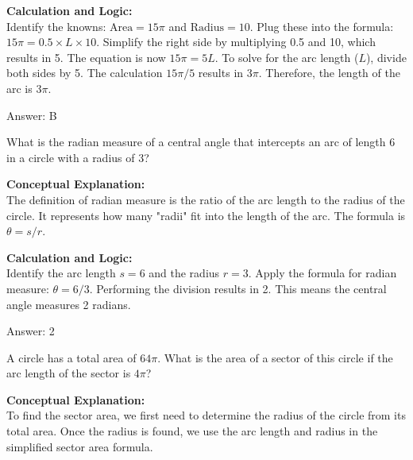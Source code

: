 \documentclass[11pt,paper=a4,answers]{exam}
\begin{document}
\begin{questions}
\begin{solution}
\vspace{30pt}

\textbf{Calculation and Logic:} \\
Identify the knowns: $\text{Area} = 15\pi$ and $\text{Radius} = 10$. Plug these into the formula: $15\pi = 0.5 \times L \times 10$. Simplify the right side by multiplying 0.5 and 10, which results in 5. The equation is now $15\pi = 5L$. To solve for the arc length ($L$), divide both sides by 5. The calculation $15\pi / 5$ results in $3\pi$. Therefore, the length of the arc is $3\pi$.

\vspace{30pt}

Answer: \colorbox{yellow!100}{B}
\end{solution}

\vspace{60pt}

\question
What is the radian measure of a central angle that intercepts an arc of length 6 in a circle with a radius of 3?

\begin{solution}
\textbf{Conceptual Explanation:} \\
The definition of radian measure is the ratio of the arc length to the radius of the circle. It represents how many "radii" fit into the length of the arc. The formula is $\theta = s / r$.

\vspace{30pt}

\textbf{Calculation and Logic:} \\
Identify the arc length $s = 6$ and the radius $r = 3$. Apply the formula for radian measure: $\theta = 6 / 3$. Performing the division results in 2. This means the central angle measures 2 radians.

\vspace{30pt}

Answer: \colorbox{yellow!100}{2}
\end{solution}

\vspace{60pt}

\question
A circle has a total area of $64\pi$. What is the area of a sector of this circle if the arc length of the sector is $4\pi$?

\begin{solution}
\textbf{Conceptual Explanation:} \\
To find the sector area, we first need to determine the radius of the circle from its total area. Once the radius is found, we use the arc length and radius in the simplified sector area formula.


\end{solution}
\end{questions}
\end{document}
